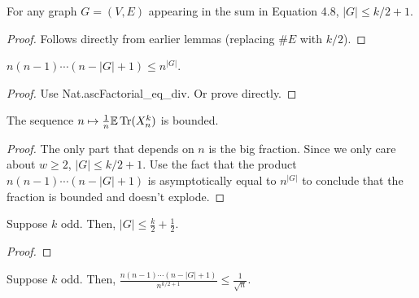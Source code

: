 \begin{lemma}
  \label{lem:vertex_bound}
  \notready
  For any graph $G = (V, E)$ appearing in the sum in Equation 4.8, $|G| \le k/2 + 1$.
\end{lemma}

\begin{proof}
  \notready
  Follows directly from earlier lemmas (replacing $\#E$ with $k/2$).
\end{proof}



\begin{lemma}
  \label{lem:asc_factorial_product}
  \notready
  $n(n-1)\cdots (n-|G|+1) \le n^{|G|}$.

\end{lemma}

\begin{proof}
  \notready
  Use Nat.ascFactorial\_eq\_div. Or prove directly.
\end{proof}



\begin{lemma}
  \label{lem:bounded_map}
  \notready
  The sequence $n\mapsto \frac1n\mathbb{E}\operatorname{Tr}(X_n^k)$ is bounded.
\end{lemma}


\begin{proof}
  \notready
  The only part that depends on $n$ is the big fraction. Since we only care about $w \ge 2$, $|G| \le k/2 + 1$. Use the fact that the product $n(n-1)\cdots (n-|G|+1)$ is asymptotically equal to $n^{|G|}$ to conclude that the fraction is bounded and doesn't explode.
\end{proof}

\begin{lemma}
  \label{lem:odd_vertex_bound}
  \notready
  Suppose $k$ odd. Then, $|G| \le \frac{k}{2} + \frac{1}{2}$.
\end{lemma}

\begin{proof}
  \notready
\end{proof}

\begin{lemma}
  \label{lem:odd_ratio_bound}
  \notready
  Suppose $k$ odd. Then, $\frac{n(n-1)\cdots(n-|G|+1)}{n^{k/2+1}} \le \frac{1}{\sqrt{n}}$.
\end{lemma}

